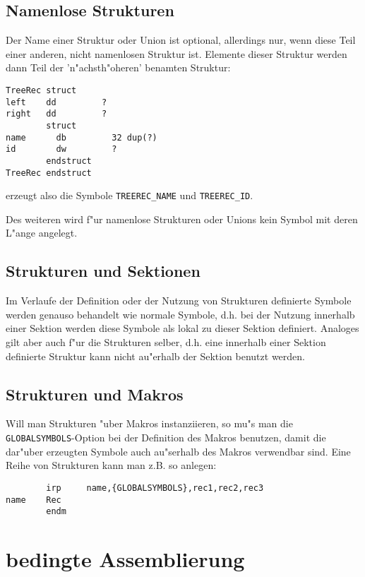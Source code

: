 \documentclass[12pt,a4paper,twoside]{report}
\newcommand{\tty}[1]{{\tt #1}}
\begin{document}
\subsection{Namenlose Strukturen}

Der Name einer Struktur oder Union ist optional, allerdings nur, wenn
diese Teil einer anderen, nicht namenlosen Struktur ist.  Elemente
dieser Struktur werden dann Teil der 'n"achsth"oheren' benamten
Struktur:
\begin{verbatim}
TreeRec struct
left    dd         ?
right   dd         ?
        struct
name      db         32 dup(?)
id        dw         ?
        endstruct
TreeRec endstruct
\end{verbatim}
erzeugt also die Symbole {\tt TREEREC\_NAME} und {\tt TREEREC\_ID}.

Des weiteren wird f"ur namenlose Strukturen oder Unions kein Symbol
mit deren L"ange angelegt.

\subsection{Strukturen und Sektionen}

Im Verlaufe der Definition oder der Nutzung von Strukturen definierte
Symbole werden genauso behandelt wie normale Symbole, d.h. bei der Nutzung
innerhalb einer Sektion werden diese Symbole als lokal zu dieser Sektion
definiert.  Analoges gilt aber auch f"ur die Strukturen selber, d.h. eine
innerhalb einer Sektion definierte Struktur kann nicht au"erhalb der
Sektion benutzt werden.

\subsection{Strukturen und Makros}

Will man Strukturen "uber Makros instanziieren, so mu"s man die
\tty{GLOBALSYMBOLS}-Option bei der Definition des Makros
benutzen, damit die dar"uber erzeugten Symbole auch au"serhalb
des Makros verwendbar sind.  Eine Reihe von Strukturen kann man
z.B. so anlegen:

\begin{verbatim}
        irp     name,{GLOBALSYMBOLS},rec1,rec2,rec3
name    Rec
        endm
\end{verbatim}


\section{bedingte Assemblierung}
\end{document}
